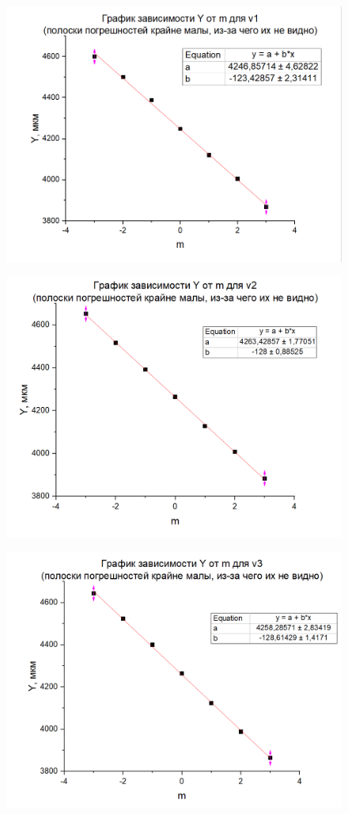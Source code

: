 \documentclass[a4paper,12pt]{article}
\begin{document}
\begin{figure}[H]
	\centering
	\includegraphics[width=0.8\linewidth]{graph1.png}
\end{figure}
\begin{figure}[H]
	\centering
	\includegraphics[width=0.8\linewidth]{graph2.png}
\end{figure}
\begin{figure}[H]
	\centering
	\includegraphics[width=0.8\linewidth]{graph3.png}
\end{figure}
\end{document}
